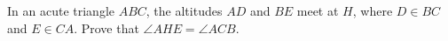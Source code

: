 In an acute triangle $ABC$, the altitudes $AD$ and $BE$ meet at $H$, where $D\in BC$ and $E\in CA$. Prove that $\angle AHE=\angle ACB$.
